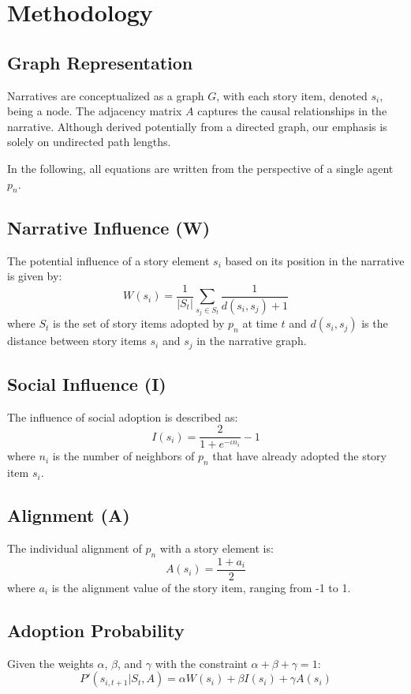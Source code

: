 \documentclass[sn-mathphys,Numbered]{sn-jnl}%
\theoremstyle{thmstyleone}%
\theoremstyle{thmstyletwo}%
\theoremstyle{thmstylethree}%
\begin{document}
\section{Methodology}

\subsection{Graph Representation}
Narratives are conceptualized as a graph \(G\), with each story item, denoted \(s_i\), being a node. The adjacency matrix \(A\) captures the causal relationships in the narrative. Although derived potentially from a directed graph, our emphasis is solely on undirected path lengths.

In the following, all equations are written from the perspective of a single agent $p_n$.


\subsection{Narrative Influence (W)}
The potential influence of a story element $s_i$ based on its position in the narrative is given by:
\[ W(s_i) = \frac{1}{|S_t|} \sum_{s_j \in S_t} \frac{1}{d(s_i, s_j) + 1} \]
where \( S_t \) is the set of story items adopted by $p_n$ at time \( t \) and \( d(s_i, s_j) \) is the distance between story items \( s_i \) and \( s_j \) in the narrative graph.

\subsection{Social Influence (I)}
The influence of social adoption is described as:
\[ I(s_i) = \frac{2}{1 + e^{-\iota n_i}} -1\]
where \( n_i \) is the number of neighbors of $p_n$ that have already adopted the story item $s_i$.

\subsection{Alignment (A)}
The individual alignment of $p_n$ with a story element is:
\[ A(s_i) = \frac{1 + a_i}{2} \]
where \( a_i \) is the alignment value of the story item, ranging from -1 to 1.

\subsection{Adoption Probability}
Given the weights \( \alpha \), \( \beta \), and \( \gamma \) with the constraint \( \alpha + \beta + \gamma = 1 \):
\[ P'(s_{i,t+1}|S_t,A) = \alpha W(s_i) + \beta I(s_i) + \gamma A(s_i) \]
\end{document}
